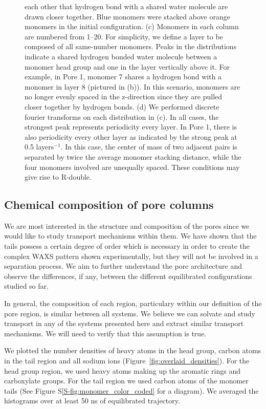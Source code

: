 \documentclass[journal=jpcbfk,manuscript=article]{achemso}
\begin{document}
\begin{figure}[!htb]
{  each other that hydrogen bond with a shared water molecule are drawn closer
  together. Blue monomers were stacked above orange monomers in the initial configuration.
  (c) Monomers in each column are numbered from 1--20. For simplicity, we define a layer to
  be composed of all same-number monomers. Peaks in the distributions indicate
  a shared hydrogen bonded water molecule between a monomer head group and one in the layer
  vertically above it. For example, in Pore 1, monomer 7 shares a hydrogen bond with
  a monomer in layer 8 (pictured in (b)). In this scenario, monomers are no longer evenly
  spaced in the z-direction since they are pulled closer together by hydrogen bonds. 
  (d) We performed discrete fourier transforms on each distribution in (c). In all cases,
  the strongest peak represents periodicity every layer. In Pore 1, there is also periodicity
  every other layer as indicated by the strong peak at 0.5 layers$^{-1}$. In this case, the
  center of mass of two adjacent pairs is separated by twice the average monomer stacking 
  distance, while the four monomers involved are unequally spaced. These conditions may
  give rise to R-double.}\label{fig:hbonds}
  \end{figure}
  
  \subsection{Chemical composition of pore columns}

  We are most interested in the structure and composition of the pores since we would like to study
  transport mechanisms within them. We have shown that the tails possess a certain degree of order
  which is necessary in order to create the complex WAXS pattern shown experimentally, but
  they will not be involved in a separation process. We aim to further understand the pore
  architecture and observe the differences, if any, between the different equilibrated
  configurations studied so far.

  In general, the composition of each region, particulary within our definition of 
  the pore region, is similar between all systems. We believe we can solvate and study transport
  in any of the systems presented here and extract similar transport mechanisms. We will 
  need to verify that this assumption is true. 
  
  We plotted the number densities of heavy atoms in the head group, carbon atoms in the tail
  region and all sodium ions (Figure~\ref{fig:overlaid_densities}). For the head group
  region, we used heavy atoms making up the aromatic rings and carboxylate groups. For the tail
  region we used carbon atoms of the monomer tails (See Figure S\ref{S-fig:monomer_color_coded}
  for a diagram). We averaged the histograms over at least 50 ns of equilibrated trajectory.
\end{document}
